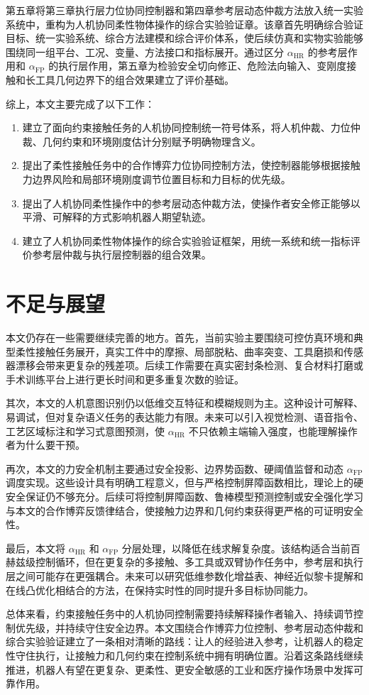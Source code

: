 第五章将第三章执行层力位协同控制器和第四章参考层动态仲裁方法放入统一实验系统中，重构为人机协同柔性物体操作的综合实验验证章。该章首先明确综合验证目标、统一实验系统、综合方法建模和综合评价体系，使后续仿真和实物实验能够围绕同一组平台、工况、变量、方法接口和指标展开。通过区分 $\alpha_{\mathrm{HR}}$ 的参考层作用和 $\alpha_{\mathrm{FP}}$ 的执行层作用，第五章为检验安全切向修正、危险法向输入、变刚度接触和长工具几何边界下的组合效果建立了评价基础。

综上，本文主要完成了以下工作：
\begin{enumerate}[label=(\arabic*)]
  \item 建立了面向约束接触任务的人机协同控制统一符号体系，将人机仲裁、力位仲裁、几何约束和环境刚度估计分别赋予明确物理含义。
  \item 提出了柔性接触任务中的合作博弈力位协同控制方法，使控制器能够根据接触力边界风险和局部环境刚度调节位置目标和力目标的优先级。
  \item 提出了人机协同柔性操作中的参考层动态仲裁方法，使操作者安全修正能够以平滑、可解释的方式影响机器人期望轨迹。
  \item 建立了人机协同柔性物体操作的综合实验验证框架，用统一系统和统一指标评价参考层仲裁与执行层控制器的组合效果。
\end{enumerate}

\section{不足与展望}
\label{sec:ch6_future}

本文仍存在一些需要继续完善的地方。首先，当前实验主要围绕可控仿真环境和典型柔性接触任务展开，真实工件中的摩擦、局部脱粘、曲率突变、工具磨损和传感器漂移会带来更复杂的残差项。后续工作需要在真实密封条检测、复合材料打磨或手术训练平台上进行更长时间和更多重复次数的验证。

其次，本文的人机意图识别仍以低维交互特征和模糊规则为主。这种设计可解释、易调试，但对复杂语义任务的表达能力有限。未来可以引入视觉检测、语音指令、工艺区域标注和学习式意图预测，使 $\alpha_{\mathrm{HR}}$ 不只依赖主端输入强度，也能理解操作者为什么要干预。

再次，本文的力安全机制主要通过安全投影、边界势函数、硬阈值监督和动态 $\alpha_{\mathrm{FP}}$ 调度实现。这些设计具有明确工程意义，但与严格控制屏障函数相比，理论上的硬安全保证仍不够充分。后续可将控制屏障函数、鲁棒模型预测控制或安全强化学习与本文的合作博弈反馈律结合，使接触力边界和几何约束获得更严格的可证明安全性。

最后，本文将 $\alpha_{\mathrm{HR}}$ 和 $\alpha_{\mathrm{FP}}$ 分层处理，以降低在线求解复杂度。该结构适合当前百赫兹级控制循环，但在更复杂的多接触、多工具或双臂协作任务中，参考层和执行层之间可能存在更强耦合。未来可以研究低维参数化增益表、神经近似黎卡提解和在线凸优化相结合的方法，在保持实时性的同时提升多目标协同能力。

总体来看，约束接触任务中的人机协同控制需要持续解释操作者输入、持续调节控制优先级，并持续守住安全边界。本文围绕合作博弈力位控制、参考层动态仲裁和综合实验验证建立了一条相对清晰的路线：让人的经验进入参考，让机器人的稳定性守住执行，让接触力和几何约束在控制系统中拥有明确位置。沿着这条路线继续推进，机器人有望在更复杂、更柔性、更安全敏感的工业和医疗操作场景中发挥可靠作用。
